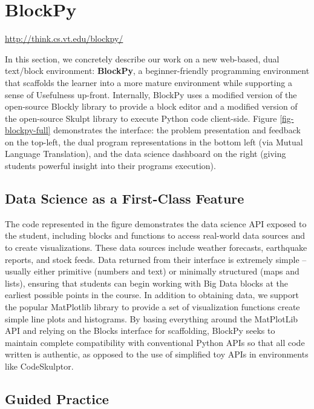 \documentclass{sig-alternate}
\begin{document}
\newpage

\section{BlockPy}
\url{http://think.cs.vt.edu/blockpy/} 
	
In this section, we concretely describe our work on a new web-based, dual text/block environment:
\textbf{BlockPy}, a beginner-friendly programming environment that scaffolds the learner into a more mature environment while supporting a sense of Usefulness up-front.
Internally, BlockPy uses a modified version of the open-source Blockly library to provide a block editor and a modified version of the open-source Skulpt library to execute Python code client-side.
Figure \ref{fig-blockpy-full} demonstrates the interface: the problem presentation and feedback on the top-left, the dual program representations in the bottom left (via Mutual Language Translation), and the data science dashboard on the right (giving students powerful insight into their programs execution).

\subsection{Data Science as a First-Class Feature}

The code represented in the figure demonstrates the data science API exposed to the student, including blocks and functions to access real-world data sources and to create visualizations.
These data sources include weather forecasts, earthquake reports, and stock feeds.
Data returned from their interface is extremely simple -- usually either primitive (numbers and text) or minimally structured (maps and lists), ensuring that students can begin working with Big Data blocks at the earliest possible points in the course.
In addition to obtaining data, we support the popular MatPlotlib library to provide a set of visualization functions create simple line plots and histograms.
By basing everything around the MatPlotLib API and relying on the Blocks interface for scaffolding, BlockPy seeks to maintain complete compatibility with conventional Python APIs so that all code written is authentic, as opposed to the use of simplified toy APIs in environments like CodeSkulptor.

\subsection{Guided Practice}
\end{document}
